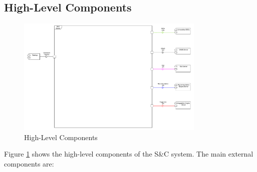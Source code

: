 \subsection{High-Level Components}
\label{sub:high-level-components}

\begin{figure}[H]
    \centering
    \includegraphics[width=0.8\textwidth]{Images/High_Level_Architectural_Design.pdf}
    \caption{High-Level Components}
    \label{fig:high-level-components}
\end{figure}

\par Figure \ref{fig:high-level-components} shows the high-level components of the S\&C system. The main external components are:


